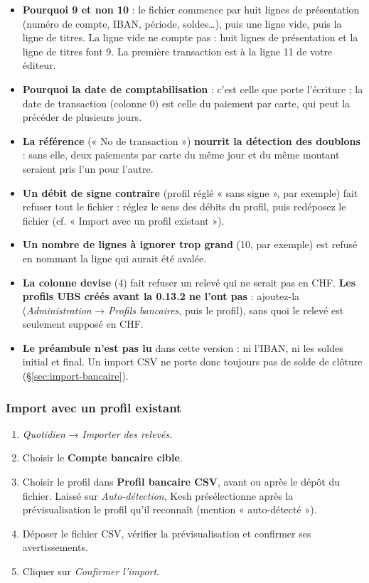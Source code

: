 \documentclass[a4paper,11pt,oneside]{article}
\begin{document}
\begin{itemize}
    \item \textbf{Pourquoi 9 et non 10} : le fichier commence par huit lignes de présentation (numéro de compte, IBAN, période, soldes…), puis une ligne vide, puis la ligne de titres. La ligne vide ne compte pas : huit lignes de présentation et la ligne de titres font 9. La première transaction est à la ligne 11 de votre éditeur.
    \item \textbf{Pourquoi la date de comptabilisation} : c'est celle que porte l'écriture ; la date de transaction (colonne 0) est celle du paiement par carte, qui peut la précéder de plusieurs jours.
    \item \textbf{La référence} (« No de transaction ») \textbf{nourrit la détection des doublons} : sans elle, deux paiements par carte du même jour et du même montant seraient pris l'un pour l'autre.
    \item \textbf{Un débit de signe contraire} (profil réglé « sans signe », par exemple) fait refuser tout le fichier : réglez le sens des débits du profil, puis redéposez le fichier (cf. « Import avec un profil existant »).
    \item \textbf{Un nombre de lignes à ignorer trop grand} (10, par exemple) est refusé en nommant la ligne qui aurait été avalée.
    \item \textbf{La colonne devise} (4) fait refuser un relevé qui ne serait pas en CHF. \textbf{Les profils UBS créés avant la 0.13.2 ne l'ont pas} : ajoutez-la (\emph{Administration} → \emph{Profils bancaires}, puis le profil), sans quoi le relevé est seulement supposé en CHF.
    \item \textbf{Le préambule n'est pas lu} dans cette version : ni l'IBAN, ni les soldes initial et final. Un import CSV ne porte donc toujours pas de solde de clôture (\S\ref{sec:import-bancaire}).
\end{itemize}

\subsubsection{Import avec un profil existant}\label{sec:import-csv-profil}

\begin{enumerate}
    \item \emph{Quotidien} → \emph{Importer des relevés}.
    \item Choisir le \textbf{Compte bancaire cible}.
    \item Choisir le profil dans \textbf{Profil bancaire CSV}, avant ou après le dépôt du fichier.
    Laissé sur \emph{Auto-détection}, Kesh présélectionne après la prévisualisation le profil
    qu'il reconnaît (mention « auto-détecté »).
    \item Déposer le fichier CSV, vérifier la prévisualisation et confirmer ses avertissements.
    \item Cliquer sur \emph{Confirmer l'import}.
\end{enumerate}
\end{document}
